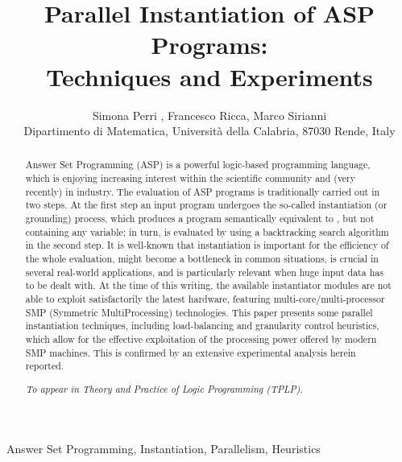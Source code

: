 \documentclass[preprint]{tlp}
\title[Theory and Practice of Logic Programming]{ Parallel Instantiation of ASP Programs: \\ Techniques and Experiments}
\author[Simona Perri, Francesco Ricca, Marco Sirianni]
{Simona Perri , Francesco Ricca,
Marco Sirianni\\
Dipartimento di Matematica, Universit{\`a} della Calabria, 87030 Rende, Italy\\
\email{\{perri,ricca,sirianni\}@mat.unical.it}}
\begin{document}
\maketitle

\begin{abstract}

Answer Set Programming (ASP) is a powerful logic-based programming
language, which is enjoying increasing interest within the
scientific community and (very recently) in industry.
The evaluation of ASP programs is traditionally carried out in two
steps. At the first step an input program  undergoes the
so-called instantiation (or grounding) process, which produces a
program  semantically equivalent to , but not containing
any variable; in turn,  is evaluated by using a backtracking
search algorithm in the second step.
It is well-known that instantiation is important for the efficiency
of the whole evaluation, might become a bottleneck in common
situations, is crucial in several real-world applications, and is
particularly relevant when huge input data has to be dealt with.
At the time of this writing, the available instantiator modules are
not able to exploit satisfactorily the latest hardware, featuring
multi-core/multi-processor SMP (Symmetric MultiProcessing)
technologies.
This paper presents some parallel instantiation techniques, including
load-balancing and granularity control heuristics, which allow for the effective exploitation of
the processing power offered by modern SMP machines.
This is confirmed by an extensive experimental analysis herein reported.


{\em To appear in Theory and Practice of Logic Programming (TPLP)}.
\end{abstract}

\begin{keywords}
Answer Set Programming, Instantiation, Parallelism, Heuristics
\end{keywords}
\end{document}

